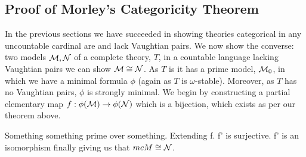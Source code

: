 \subsection{Proof of Morley's Categoricity Theorem}

In the previous sections we have succeeded in showing theories categorical in any uncountable cardinal are \omst and lack Vaughtian pairs. 
We now show the converse: two models \(\mathcal{M}, \mathcal{N}\)  of a complete \omst theory, \(T\), in a countable language lacking Vaughtian pairs we can show \(\mathcal{M} \cong \mathcal{N}\). 
As \(T\) is \omst it has a prime model, \(\mathcal{M}_0\), in which we have a minimal formula \(\phi\) (again as \(T\) is \(\omega\)-stable).
Moreover, as \(T\) has no Vaughtian pairs, \(\phi\) is strongly minimal. 
We begin by constructing a partial elementary map \(f:\phi(\mathcal{M}) \to \phi(\mathcal{N})\) which is a bijection, which exists as per our theorem above.

Something something \mcM prime over something. Extending f. f' is surjective. f' is an isomorphism finally giving us that \(mcM \cong \mathcal{N}\). 

